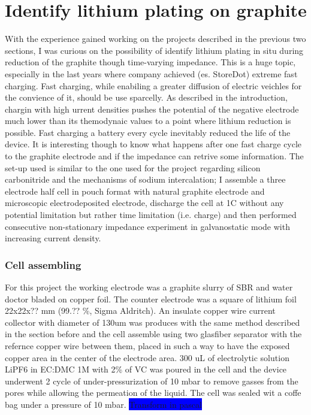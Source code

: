 \chapter{Identify lithium plating on graphite}
With the experience gained working on the projects described in the previous two sections, I was curious on the possibility of identify lithium plating in situ during reduction of the graphite though time-varying impedance. This is a huge topic, especially in the last years where company achieved (es. StoreDot) extreme fast charging. Fast charging, while enabiling a greater diffusion of electric veichles for the convience of it, should be use sparcelly. \colorbox{BurntOrange}{As described in the introduction}, chargin with high urrent densities pushes the potential of the negative electrode much lower than its themodynaic values to a point where lithium reduction is possible. Fast charging a battery every cycle inevitably reduced the life of the device. It is interesting though to know what happens after one fast charge cycle to the graphite electrode and if the impedance can retrive some information. The set-up used is similar to the one used for the project regarding silicon carbonitride and the mechanisms of sodium intercalation; I assemble a three electrode half cell in pouch format with natural graphite electrode and microscopic electrodeposited electrode, discharge the cell at 1C without any potential limitation but rather time limitation (i.e. charge) and then performed consecutive non-stationary impedance experiment in galvanostatic mode with increasing current density.

\subsection{Cell assembling}
For this project the working electrode was a graphite slurry of SBR and water doctor bladed on copper foil. The counter electrode was a square of lithium foil 22x22x?? mm (99.?? \%, Sigma Aldritch). An insulate copper wire current collector with diameter of 130um was produces with the same method described in the section before and the cell assemble using two glasfiber separator with the refernce copper wire between them, placed in such a way to have the exposed copper area in the center of the electrode area. 300 uL of electrolytic solution LiPF6 in EC:DMC 1M with 2\% of VC was poured in the cell and the device underwent 2 cycle of under-pressurization of 10 mbar to remove gasses from the pores while allowing the permeation of the liquid. The cell was sealed wit a coffe bag under a pressure of 10 mbar. \colorbox{Blue}{Transform in pascal}

